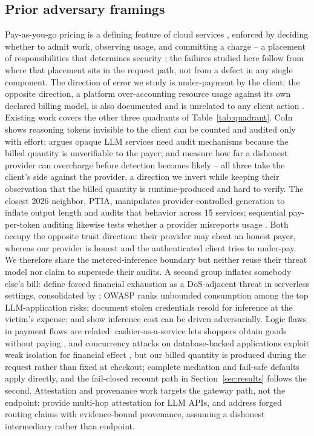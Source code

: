 \documentclass[manuscript,review]{acmart}
\begin{document}
\subsection{Prior adversary framings}
Pay-as-you-go pricing is a defining feature of cloud services \citep{armbrust}, enforced
by deciding whether to admit work, observing usage, and committing a charge -- a
placement of responsibilities that determines security \citep{bass}; the failures studied
here follow from where that placement sits in the request path, not from a defect in any
single component. The direction of error we study is under-payment by the client; the
opposite direction, a platform over-accounting resource usage against its own declared
billing model, is also documented and is unrelated to any client action
\citep{serverlesscosts}. Existing work covers the other three quadrants of
Table~\ref{tab:quadrant}. CoIn \citep{coin} shows reasoning tokens invisible to the client
can be counted and audited only with effort; \citet{invisible} argues opaque LLM services
need audit mechanisms because the billed quantity is unverifiable to the payer; and
\citet{tokeninflation} measure how far a dishonest provider can overcharge before
detection becomes likely -- all three take the client's side against the provider, a
direction we invert while keeping their observation that the billed quantity is
runtime-produced and hard to verify. The closest 2026 neighbor, PTIA, manipulates
provider-controlled generation to inflate output length and audits that behavior across
15 services; sequential pay-per-token auditing likewise tests whether a provider
misreports usage \citep{ptia,auditingpaypertoken}. Both occupy the opposite trust
direction: their provider may cheat an honest payer, whereas our provider is honest and
the authenticated client tries to under-pay. We therefore share the metered-inference
boundary but neither reuse their threat model nor claim to supersede their audits. A
second group inflates somebody else's bill: \citet{dow} define forced financial
exhaustion as a DoS-adjacent threat in serverless settings, consolidated by
\citet{dowreview}; OWASP \citep{owasp} ranks unbounded consumption among the top
LLM-application risks; \citet{llmjacking} document stolen credentials resold for
inference at the victim's expense; and \citet{sponge} show inference cost can be driven
adversarially. Logic flaws in payment flows are related: cashier-as-a-service lets
shoppers obtain goods without paying \citep{cashier}, and concurrency attacks on
database-backed applications exploit weak isolation for financial effect
\citep{acidrain}, but our billed quantity is produced during the request rather than
fixed at checkout; complete mediation and fail-safe defaults \citep{saltzer} apply
directly, and the fail-closed recount path in Section~\ref{sec:results} follows the
second. Attestation and provenance work targets the gateway path, not the endpoint: \citet{aex}
provide multi-hop attestation for LLM APIs, and \citet{gwprov} address forged routing
claims with evidence-bound provenance, assuming a dishonest intermediary rather than
endpoint.
\end{document}
